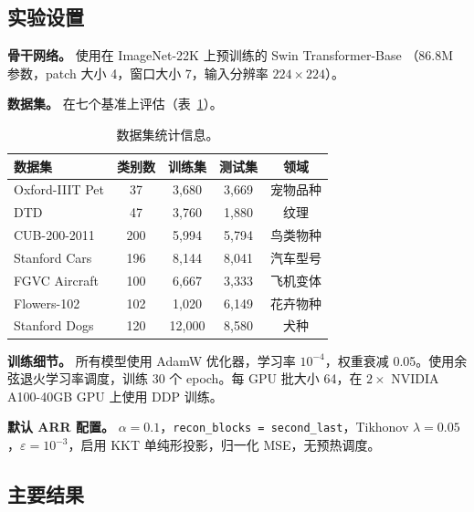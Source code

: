 \documentclass[preprint,12pt]{elsarticle}
\begin{document}
\subsection{实验设置}

\textbf{骨干网络。} 使用在 ImageNet-22K 上预训练的 Swin Transformer-Base \cite{liu2021swin}（86.8M 参数，patch 大小 4，窗口大小 7，输入分辨率 $224 \times 224$）。

\textbf{数据集。} 在七个基准上评估（表~\ref{tab:datasets}）。

\begin{table}[t]
\centering
\caption{数据集统计信息。}\label{tab:datasets}
\begin{tabular}{lcccc}
\toprule
数据集 & 类别数 & 训练集 & 测试集 & 领域 \\
\midrule
Oxford-IIIT Pet & 37 & 3,680 & 3,669 & 宠物品种 \\
DTD & 47 & 3,760 & 1,880 & 纹理 \\
CUB-200-2011 & 200 & 5,994 & 5,794 & 鸟类物种 \\
Stanford Cars & 196 & 8,144 & 8,041 & 汽车型号 \\
FGVC Aircraft & 100 & 6,667 & 3,333 & 飞机变体 \\
Flowers-102 & 102 & 1,020 & 6,149 & 花卉物种 \\
Stanford Dogs & 120 & 12,000 & 8,580 & 犬种 \\
\bottomrule
\end{tabular}
\end{table}

\textbf{训练细节。} 所有模型使用 AdamW 优化器，学习率 $10^{-4}$，权重衰减 0.05。使用余弦退火学习率调度，训练 30 个 epoch。每 GPU 批大小 64，在 $2\times$ NVIDIA A100-40GB GPU 上使用 DDP 训练。

\textbf{默认 ARR 配置。} $\alpha = 0.1$，\texttt{recon\_blocks = second\_last}，Tikhonov $\lambda = 0.05$，$\varepsilon = 10^{-3}$，启用 KKT 单纯形投影，归一化 MSE，无预热调度。

\subsection{主要结果}
\end{document}

